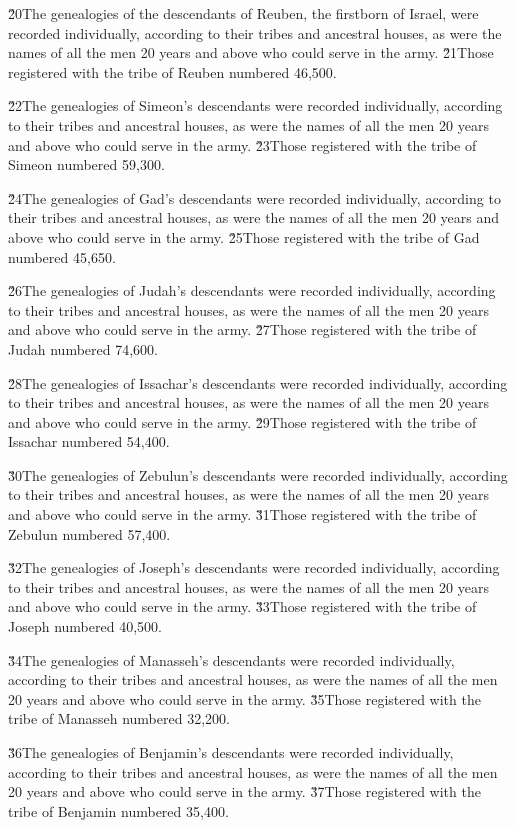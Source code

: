 \v{20}The genealogies of the descendants of Reuben, the firstborn of Israel, were recorded individually, according to their tribes and ancestral houses, as were the names of all the men 20 years and above who could serve in the army. \v{21}Those registered with the tribe of Reuben numbered 46,500.

\v{22}The genealogies of Simeon's descendants were recorded individually, according to their tribes and ancestral houses, as were the names of all the men 20 years and above who could serve in the army. \v{23}Those registered with the tribe of Simeon numbered 59,300.

\v{24}The genealogies of Gad's descendants were recorded individually, according to their tribes and ancestral houses, as were the names of all the men 20 years and above who could serve in the army. \v{25}Those registered with the tribe of Gad numbered 45,650.

\v{26}The genealogies of Judah's descendants were recorded individually, according to their tribes and ancestral houses, as were the names of all the men 20 years and above who could serve in the army. \v{27}Those registered with the tribe of Judah numbered 74,600.

\v{28}The genealogies of Issachar's descendants were recorded individually, according to their tribes and ancestral houses, as were the names of all the men 20 years and above who could serve in the army. \v{29}Those registered with the tribe of Issachar numbered 54,400.

\v{30}The genealogies of Zebulun's descendants were recorded individually, according to their tribes and ancestral houses, as were the names of all the men 20 years and above who could serve in the army. \v{31}Those registered with the tribe of Zebulun numbered 57,400.

\v{32}The genealogies of Joseph's descendants were recorded individually, according to their tribes and ancestral houses, as were the names of all the men 20 years and above who could serve in the army. \v{33}Those registered with the tribe of Joseph numbered 40,500.

\v{34}The genealogies of Manasseh's descendants were recorded individually, according to their tribes and ancestral houses, as were the names of all the men 20 years and above who could serve in the army. \v{35}Those registered with the tribe of Manasseh numbered 32,200.

\v{36}The genealogies of Benjamin's descendants were recorded individually, according to their tribes and ancestral houses, as were the names of all the men 20 years and above who could serve in the army. \v{37}Those registered with the tribe of Benjamin numbered 35,400.

